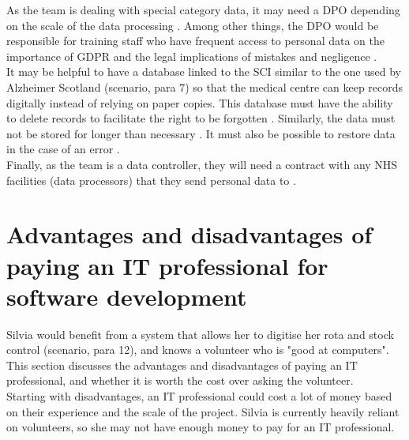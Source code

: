 \documentclass[12pt,a4paper]{article}
\begin{document}
As the team is dealing with special category data, it may need a DPO depending on the scale of the data processing \cite{Article37}. Among other things, the DPO would be responsible for training staff who have frequent access to personal data on the importance of GDPR and the legal implications of mistakes and negligence \cite{Article39&47}.\\

It may be helpful to have a database linked to the SCI similar to the one used by Alzheimer Scotland (scenario, para 7) so that the medical centre can keep records digitally instead of relying on paper copies. This database must have the ability to delete records to facilitate the right to be forgotten \cite{Article17}. Similarly, the data must not be stored for longer than necessary \cite{Article5}. It must also be possible to restore data in the case of an error \cite{Article32}.\\


Finally, as the team is a data controller, they will need a contract with any NHS facilities (data processors) that they send personal data to \cite{Article28}.

\section{Advantages and disadvantages of paying an IT professional for software development}

Silvia would benefit from a system that allows her to digitise her rota and stock control (scenario, para 12), and knows a volunteer who is "good at computers". This section discusses the advantages and disadvantages of paying an IT professional, and whether it is worth the cost over asking the volunteer.\\

Starting with disadvantages, an IT professional could cost a lot of money based on their experience and the scale of the project. Silvia is currently heavily reliant on volunteers, so she may not have enough money to pay for an IT professional.\\
\end{document}
